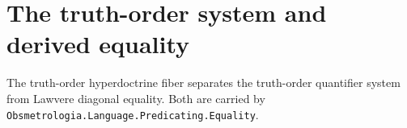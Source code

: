 \section{The truth-order system and derived equality}

The truth-order hyperdoctrine fiber separates the truth-order quantifier
system from Lawvere diagonal equality. Both are carried by
\texttt{Obsmetrologia.Language.Predicating.Equality}.



